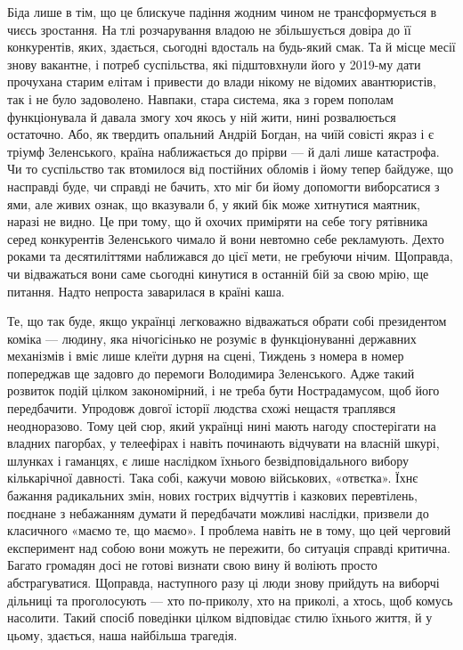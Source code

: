 Біда лише в тім, що це блискуче падіння жодним чином не трансформується в чиєсь
зростання. На тлі розчарування владою не збільшується довіра до її конкурентів,
яких, здається, сьогодні вдосталь на будь-який смак. Та й місце месії знову
вакантне, і потреб суспільства, які підштовхнули його у 2019-му дати прочухана
старим елітам і привести до влади нікому не відомих авантюристів, так і не було
задоволено. Навпаки, стара система, яка з горем пополам функціонувала й давала
змогу хоч якось у ній жити, нині розвалюється остаточно. Або, як твердить
опальний Андрій Богдан, на чиїй совісті якраз і є тріумф Зеленського, країна
наближається до прірви — й далі лише катастрофа. Чи то суспільство так
втомилося від постійних обломів і йому тепер байдуже, що насправді буде, чи
справді не бачить, хто міг би йому допомогти виборсатися з ями, але живих
ознак, що вказували б, у який бік може хитнутися маятник, наразі не видно. Це
при тому, що й охочих приміряти на себе тогу рятівника серед конкурентів
Зеленського чимало й вони невтомно себе рекламують. Дехто роками та
десятиліттями наближався до цієї мети, не гребуючи нічим. Щоправда, чи
відважаться вони саме сьогодні кинутися в останній бій за свою мрію, ще
питання. Надто непроста заварилася в країні каша.

Те, що так буде, якщо українці легковажно відважаться обрати собі президентом
коміка — людину, яка нічогісінько не розуміє в функціонуванні державних
механізмів і вміє лише клеїти дурня на сцені, Тиждень з номера в номер
попереджав ще задовго до перемоги Володимира Зеленського. Адже такий розвиток
подій цілком закономірний, і не треба бути Нострадамусом, щоб його передбачити.
Упродовж довгої історії людства схожі нещастя траплявся неодноразово. Тому цей
сюр, який українці нині мають нагоду спостерігати на владних пагорбах, у
телеефірах і навіть починають відчувати на власній шкурі, шлунках і гаманцях, є
лише наслідком їхнього безвідповідального вибору кількарічної давності. Така
собі, кажучи мовою військових, «отвєтка». Їхнє бажання радикальних змін, нових
гострих відчуттів і казкових перевтілень, поєднане з небажанням думати й
передбачати можливі наслідки, призвели до класичного «маємо те, що маємо». І
проблема навіть не в тому, що цей черговий експеримент над собою вони можуть не
пережити, бо ситуація справді критична. Багато громадян досі не готові визнати
свою вину й воліють просто абстрагуватися. Щоправда, наступного разу ці люди
знову прийдуть на виборчі дільниці та проголосують — хто по-приколу, хто на
приколі, а хтось, щоб комусь насолити. Такий спосіб поведінки цілком відповідає
стилю їхнього життя, й у цьому, здається, наша найбільша трагедія.

